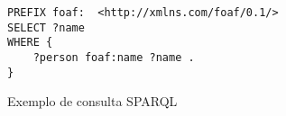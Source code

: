 
\begin{figure}[!ht]
    \begin{lstlisting}[language=SPARQL]
PREFIX foaf:  <http://xmlns.com/foaf/0.1/>
SELECT ?name
WHERE {
    ?person foaf:name ?name .
}
    \end{lstlisting}
    \caption{Exemplo de consulta SPARQL}
    \label{fig:exemplo_codigo_sparql} 
\end{figure}











